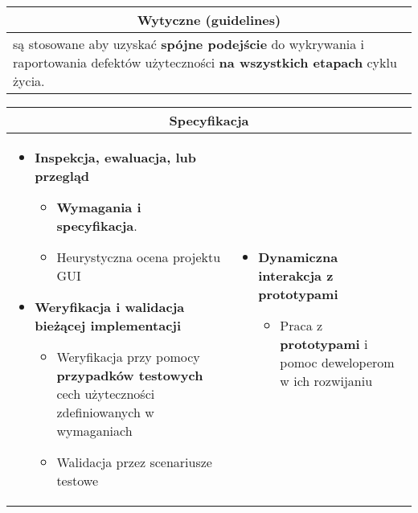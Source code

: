 \documentclass[../main.tex]{subfiles}
\begin{document}
    \begin{table}[H]
        \begin{center}
            \begin{tabular}{| p{8cm} | p{8cm} |}
                \hline
                \multicolumn{2}{|c|}{\textbf{Wytyczne (guidelines)}}\\
                \hline
                \multicolumn{2}{|p{16,5cm}|}{są stosowane aby uzyskać \textbf{spójne podejście} do wykrywania i raportowania defektów
                użyteczności \textbf{na wszystkich etapach} cyklu życia.}\\
                \hline
            \end{tabular}
        \end{center}
    \end{table}
    \begin{table}[H]
        \begin{center}
            \begin{tabular}{| p{8cm} | p{8cm} |}
                \hline
                \multicolumn{2}{|c|}{\textbf{Specyfikacja}}\\
                \hline
                \begin{itemize}
                    \item \textbf{Inspekcja, ewaluacja, lub przegląd}
                    \begin{itemize}
                        \item \textbf{Wymagania i specyfikacja}.
                        \item Heurystyczna ocena projektu GUI
                    \end{itemize}

                    \item \textbf{Weryfikacja i walidacja bieżącej implementacji}
                    \begin{itemize}
                        \item Weryfikacja przy pomocy \textbf{przypadków testowych} cech użyteczności
                        zdefiniowanych w wymaganiach
                        \item Walidacja przez scenariusze testowe
                    \end{itemize}
                \end{itemize}
                &
                \begin{itemize}
                    \item \textbf{Dynamiczna interakcja z prototypami}
                    \begin{itemize}
                        \item Praca z \textbf{prototypami} i pomoc deweloperom w ich rozwijaniu
                    \end{itemize}


\end{itemize}
\end{tabular}
\end{center}
\end{table}
\end{document}
